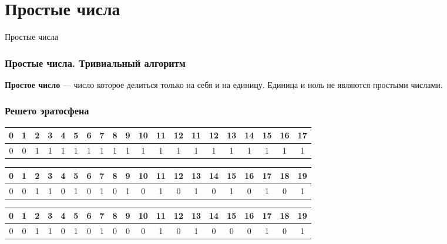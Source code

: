 \section{Простые числа}


\begin{frame}
    \center \Huge Простые числа 
\end{frame}


\begin{frame}[fragile]
	\frametitle{Простые числа. Тривиальный алгоритм}
    \quad \textbf{Простое число} --- число которое делиться только на себя и на единицу. Единица и ноль не являются простыми числами.

\end{frame}


\begin{frame}
	\frametitle{Решето эратосфена}

    \begin{tabular}{|c|c|c|c|c|c|c|c|c|c|c|c|c|c|c|c|c|c|c|c|}
        \hline
        0&1&2&3&4&5&6&7&8&9&10&11&12&11&12&13&14&15&16&17 \\
        \hline
        0&0&1&1&1&1&1&1&1&1&1&1&1&1&1&1&1&1&1&1 \\
        \hline
    \end{tabular}


    \bigskip

    \begin{tabular}{|c|c|c|c|c|c|c|c|c|c|c|c|c|c|c|c|c|c|c|c|}
        \hline
        0&1&2&3&4&5&6&7&8&9&10&11&12&13&14&15&16&17&18&19 \\
        \hline
        0&0&1&1&\cellcolor{yellow!25}0&1&\cellcolor{yellow!25}0&1&\cellcolor{yellow!25}0&1&\cellcolor{yellow!25}0&1&\cellcolor{yellow!25}0&1&\cellcolor{yellow!25}0&1&\cellcolor{yellow!25}0&1&\cellcolor{yellow!25}0&1 \\
        \hline
    \end{tabular}

    \bigskip


    \begin{tabular}{|c|c|c|c|c|c|c|c|c|c|c|c|c|c|c|c|c|c|c|c|}
        \hline
        0&1&2&3&4&5&6&7&8&9&10&11&12&13&14&15&16&17&18&19 \\
        \hline
        0&0&1&1&0&1&0&1&0&\cellcolor{yellow!25}0&0&1&0&1&0&\cellcolor{yellow!25}0&0&1&0&1 \\
        \hline
    \end{tabular}

\end{frame}

